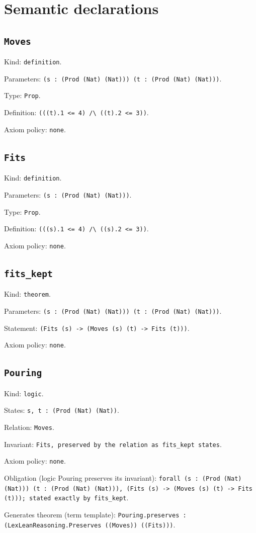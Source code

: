 \documentclass[11pt]{article}
\begin{document}
\section*{Semantic declarations}
\subsection*{\texttt{Moves}}
\noindent Kind: \texttt{definition}.\par
\noindent Parameters: \texttt{(s : (Prod (Nat) (Nat))) (t : (Prod (Nat) (Nat)))}.\par
\noindent Type: \texttt{Prop}.\par
\noindent Definition: \texttt{(((t).1 <= 4) /\textbackslash{} ((t).2 <= 3))}.\par
\noindent Axiom policy: \texttt{none}.\par
\subsection*{\texttt{Fits}}
\noindent Kind: \texttt{definition}.\par
\noindent Parameters: \texttt{(s : (Prod (Nat) (Nat)))}.\par
\noindent Type: \texttt{Prop}.\par
\noindent Definition: \texttt{(((s).1 <= 4) /\textbackslash{} ((s).2 <= 3))}.\par
\noindent Axiom policy: \texttt{none}.\par
\subsection*{\texttt{fits\_kept}}
\noindent Kind: \texttt{theorem}.\par
\noindent Parameters: \texttt{(s : (Prod (Nat) (Nat))) (t : (Prod (Nat) (Nat)))}.\par
\noindent Statement: \texttt{(Fits (s) -> (Moves (s) (t) -> Fits (t)))}.\par
\noindent Axiom policy: \texttt{none}.\par
\subsection*{\texttt{Pouring}}
\noindent Kind: \texttt{logic}.\par
\noindent States: \texttt{s, t : (Prod (Nat) (Nat))}.\par
\noindent Relation: \texttt{Moves}.\par
\noindent Invariant: \texttt{Fits, preserved by the relation as fits\_kept states}.\par
\noindent Axiom policy: \texttt{none}.\par
\noindent Obligation (logic Pouring preserves its invariant): \texttt{forall (s : (Prod (Nat) (Nat))) (t : (Prod (Nat) (Nat))), (Fits (s) -> (Moves (s) (t) -> Fits (t))); stated exactly by fits\_kept}.\par
\noindent Generates theorem (term template): \texttt{Pouring.preserves : (LexLeanReasoning.Preserves ((Moves)) ((Fits)))}.\par
\end{document}
